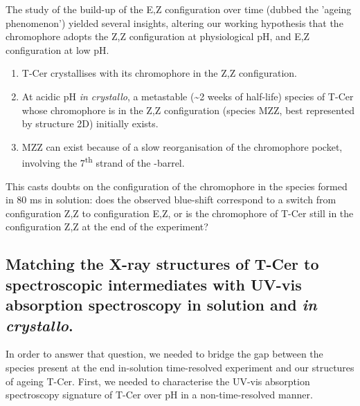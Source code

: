 The study of the build-up of the E,Z configuration over time (dubbed the 'ageing phenomenon') yielded several insights, altering our working hypothesis that the chromophore adopts the Z,Z configuration at physiological pH, and E,Z configuration at low pH. 
\begin{enumerate}
    \item T-Cer crystallises with its chromophore in the Z,Z configuration. 
    \item At acidic pH \textit{in crystallo}, a metastable (\textasciitilde 2 weeks of half-life) species of T-Cer whose chromophore is in the Z,Z configuration (species MZZ, best represented by structure 2D) initially exists.
    \item MZZ can exist because of a slow reorganisation of the chromophore pocket, involving the 7\textsuperscript{th} strand of the \textbeta-barrel. 
\end{enumerate}

This casts doubts on the configuration of the chromophore in the species formed in 80 ms in solution: does the observed blue-shift correspond to a switch from configuration Z,Z to configuration E,Z, or is the chromophore of T-Cer still in the configuration Z,Z at the end of the experiment? 



\subsection{Matching the X-ray structures of T-Cer to spectroscopic intermediates with UV-vis absorption spectroscopy in solution and \textit{in crystallo}.}
In order to answer that question, we needed to bridge the gap between the species present at the end in-solution time-resolved experiment and our structures of ageing T-Cer. First, we needed to characterise the UV-vis absorption spectroscopy signature of T-Cer over pH in a non-time-resolved manner. 

